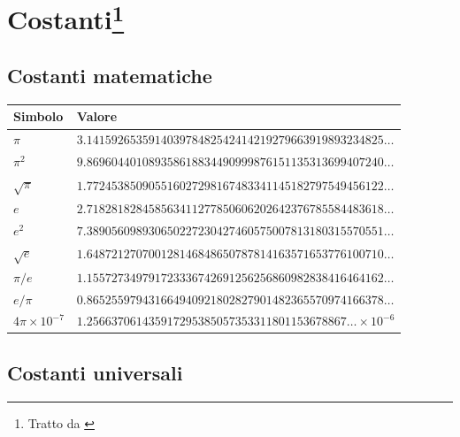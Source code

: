 \chapter[Costanti]{Costanti\protect\footnote{Tratto da \cite{mohr:1187}}}
\section{Costanti matematiche}
\begin{small}
\begin {tabular}{ll}
\hline
Simbolo&Valore\\ \hline
$\pi$&$3.141592653591403978482542414219279663919893234825\ldots$\\
$\pi^2$&$9.869604401089358618834490999876151135313699407240\ldots$\\
$\sqrt{\pi}$&$1.772453850905516027298167483341145182797549456122\ldots$\\
$e$&$2.718281828458563411277850606202642376785584483618\ldots$\\
$e^2$&$7.389056098930650227230427460575007813180315570551\ldots$\\
$\sqrt{e}$&$1.648721270700128146848650787814163571653776100710\ldots$\\
$\pi/e$&$1.155727349791723336742691256256860982838416464162\ldots$\\
$e/\pi$&$0.865255979431664940921802827901482365570974166378\ldots$\\
$4\pi\times 10^{-7}$&$1.256637061435917295385057353311801153678867\ldots\times 10^{-6}$\\
\hline
\end{tabular}
\section{Costanti universali}


\end{small}
